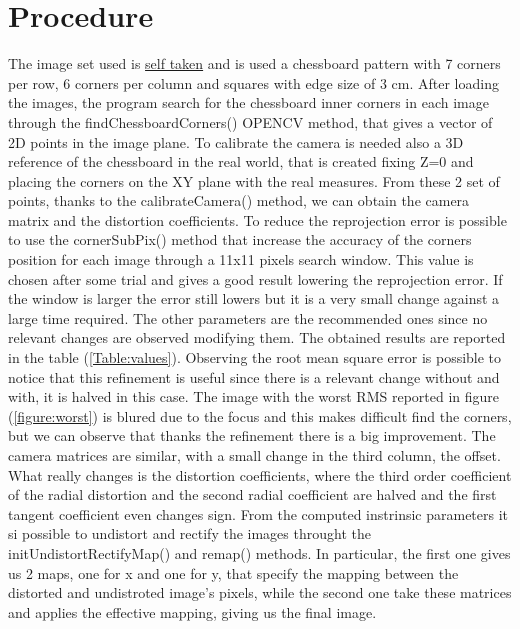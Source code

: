 \documentclass[11pt,a4paper]{article}
\newcommand{\cc}{\fontfamily{txtt}\selectfont}
\begin{document}
\section{Procedure}
The image set used is  \href{https://drive.google.com/drive/folders/1cFiGnqadNN3DyLFu9KWS6O-nnW64IXOr?usp=sharing}{self taken} and is used a chessboard pattern with 7 corners per row, 6 corners per column and squares with edge size of 3 cm.
After loading the images, the program search for the chessboard inner corners in each image through the {\cc findChessboardCorners()} OPENCV method, that gives a vector of 2D points in the image plane.
To calibrate the camera is needed also a 3D reference of the chessboard in the real world, that is created fixing Z=0 and placing the corners on the XY plane with the real measures.
From these 2 set of points, thanks to the {\cc calibrateCamera()} method, we can obtain the camera matrix and the distortion coefficients. 
To reduce the reprojection error is possible to use the {\cc cornerSubPix()} method that increase the accuracy of the corners position for each image through a 11x11 pixels search window. 
This value is chosen after some trial and gives a good result lowering the reprojection error.
If the window is larger the error still lowers but it is a very small change against a large time required.
The other parameters are the recommended ones since no relevant changes are observed modifying them.\newline
The obtained results are reported in the table (\ref{Table:values}). 
Observing the root mean square error is possible to notice that this refinement is useful since there is a relevant change without and with, it is halved in this case.
The image with the worst RMS reported in figure (\ref{figure:worst}) is blured due to the focus and this makes difficult find the corners, but we can observe that thanks the refinement there is a big improvement.
The camera matrices are similar, with a small change in the third column, the offset.
What really changes is the distortion coefficients, where the third order coefficient of the radial distortion and the second radial coefficient are halved and the first tangent coefficient even changes sign.\newline
From the computed instrinsic parameters it si possible to undistort and rectify the images throught the {\cc initUndistortRectifyMap()} and {\cc remap()} methods.
In particular, the first one gives us 2 maps, one for x and one for y, that specify the mapping between the distorted and undistroted image's pixels, while the second one take these matrices and applies the effective mapping, giving us the final image.
\end{document}
